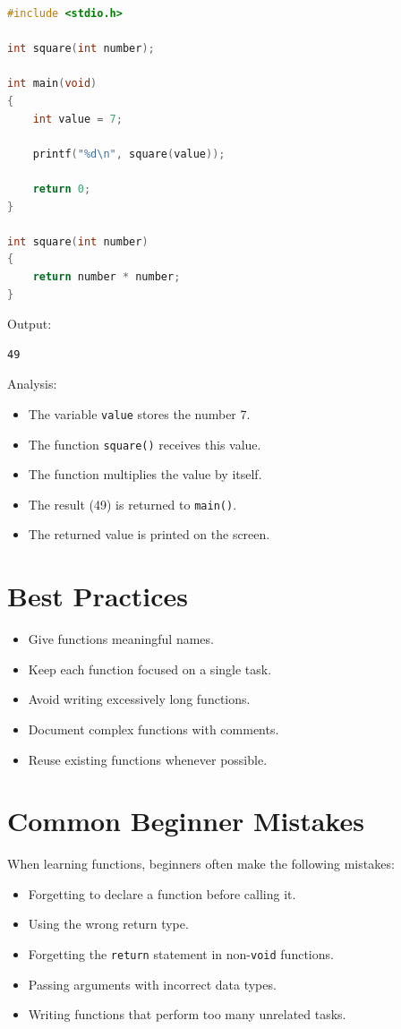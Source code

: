 \documentclass[12pt,openany]{book}
\begin{document}
\begin{lstlisting}[language=C]
#include <stdio.h>

int square(int number);

int main(void)
{
    int value = 7;

    printf("%d\n", square(value));

    return 0;
}

int square(int number)
{
    return number * number;
}
\end{lstlisting}

Output:

\begin{lstlisting}
49
\end{lstlisting}

Analysis:

\begin{itemize}
    \item The variable \texttt{value} stores the number 7.
    \item The function \texttt{square()} receives this value.
    \item The function multiplies the value by itself.
    \item The result (49) is returned to \texttt{main()}.
    \item The returned value is printed on the screen.
\end{itemize}

\section{Best Practices}

\begin{itemize}
    \item Give functions meaningful names.
    \item Keep each function focused on a single task.
    \item Avoid writing excessively long functions.
    \item Document complex functions with comments.
    \item Reuse existing functions whenever possible.
\end{itemize}
\section{Common Beginner Mistakes}

When learning functions, beginners often make the following mistakes:

\begin{itemize}
    \item Forgetting to declare a function before calling it.
    \item Using the wrong return type.
    \item Forgetting the \texttt{return} statement in non-\texttt{void} functions.
    \item Passing arguments with incorrect data types.
    \item Writing functions that perform too many unrelated tasks.
\end{itemize}
\end{document}
